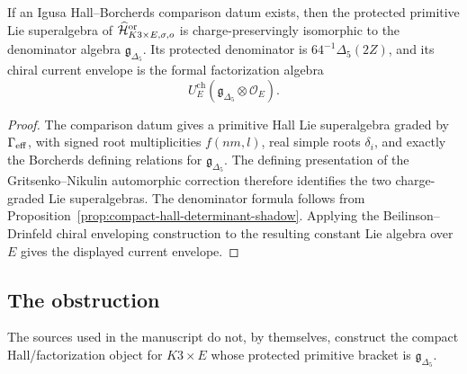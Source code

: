 \begin{theorem}
\label{thm:conditional-compact-hall-realization}
If an Igusa Hall--Borcherds comparison datum exists, then the protected
primitive Lie superalgebra of
\(\widehat{\mathcal H}^{\mathrm{or}}_{K3\times E,\sigma,o}\) is
charge-preservingly isomorphic to the denominator algebra
\(\mathfrak g_{\Delta_5}\).  Its protected denominator is
\(64^{-1}\Delta_5(2Z)\), and its chiral current envelope is the formal
factorization algebra
\[
  U_E^{\mathrm{ch}}(\mathfrak g_{\Delta_5}\otimes\mathcal O_E).
\]
\end{theorem}

\begin{proof}
The comparison datum gives a primitive Hall Lie superalgebra graded by
\(\Gamma_{\mathrm{eff}}\), with signed root multiplicities \(f(nm,l)\), real simple
roots \(\delta_i\), and exactly the Borcherds defining relations for
\(\mathfrak g_{\Delta_5}\).  The defining presentation of the
Gritsenko--Nikulin automorphic correction therefore identifies the two
charge-graded Lie superalgebras.  The denominator formula follows from
Proposition~\ref{prop:compact-hall-determinant-shadow}.  Applying the
Beilinson--Drinfeld chiral enveloping construction \cite{BD} to the
resulting constant Lie algebra over \(E\) gives the displayed current
envelope.
\end{proof}

\subsection{The obstruction}

\begin{theorem}
\label{thm:compact-hall-present-obstruction}
The sources used in the manuscript do not, by themselves, construct the
compact Hall/factorization object for \(K3\times E\) whose protected
primitive bracket is \(\mathfrak g_{\Delta_5}\).
\end{theorem}

